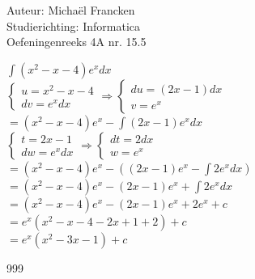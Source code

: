 \documentclass[a4paper]{article}
\begin{document}
\noindent \large Auteur: Michaël Francken \\
\noindent \large Studierichting: Informatica\\
\noindent \large Oefeningenreeks 4A nr. 15.5\\

\medskip

\normalsize

$\displaystyle \int (x^2-x-4)e^xdx$ \\

$\left \{
\begin{array}{l}
u = x^2-x-4 \\
dv = e^xdx
\end{array}
\right .
\Rightarrow
\left \{
\begin{array}{l}
du = (2x-1)dx \\
v = e^x
\end{array}
\right .$ \\

$= (x^2-x-4)e^x - \displaystyle \int (2x-1)e^xdx$ \\

$\left \{
\begin{array}{l}
t = 2x-1 \\
dw = e^xdx
\end{array}
\right .
\Rightarrow
\left \{
\begin{array}{l}
dt = 2dx \\
w = e^x
\end{array}
\right .$ \\

$= (x^2-x-4)e^x - \left( (2x-1)e^x - \displaystyle \int 2e^xdx \right)$ \\

$= (x^2-x-4)e^x - (2x-1)e^x + \displaystyle \int 2e^xdx$ \\

$= (x^2-x-4)e^x - (2x-1)e^x + 2e^x + c$ \\

$= e^x(x^2 - x - 4 - 2x + 1 + 2) + c$ \\

$= e^x(x^2 - 3x - 1) + c$ \\


\begin{thebibliography}{999}
\end{thebibliography}
\end{document}
